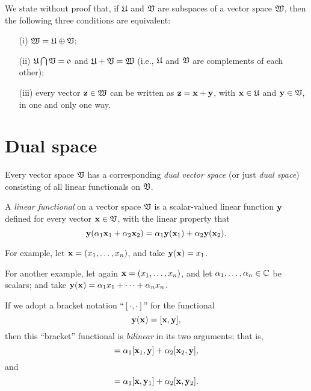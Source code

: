 We state without proof that,
if
${\frak U}$
and
${\frak V}$
are subspaces of a vector space
${\frak W}$,
then the following three conditions are equivalent:
\begin{itemize}
\item[(i)]
${\frak W}={\frak U}\oplus{\frak V}$;
\item[(ii)]
${\frak U}\bigcap{\frak V}={\frak 0}$
and
${\frak U}+{\frak V}={\frak W}$
(i.e., ${\frak U}$
and
${\frak V}$
are complements of each other);
\item[(iii)]
every vector ${\bf z}\in {\frak W}$ can be written as
${\bf z}={\bf x}+{\bf y}$, with
${\bf x}\in {\frak U}$  and
${\bf y}\in {\frak V}$, in one and only one way.
\end{itemize}


\section{Dual space}
\label{2011-m-dvs}

Every vector space ${\frak V}$
has a corresponding {\em dual vector space}
(or just {\em dual space})
consisting of all linear functionals on ${\frak V}$.

A {\em linear functional}
on a vector space ${\frak V}$ is a scalar-valued linear function ${\bf y}$
defined for every vector   ${\bf x} \in {\frak V}$, with the linear property that
\begin{equation}
{\bf y} (\alpha_1 {\bf x}_1 +\alpha_2 {\bf x}_2)
=
\alpha_1 {\bf y} ({\bf x}_1) +\alpha_2 {\bf y} ({\bf x}_2) .
\end{equation}

{\color{blue}
\bexample
For example,
let ${\bf x} = (x_1,\ldots , x_n)$, and
take
${\bf y} ({\bf x}) =x_1$.

For another example,
let again ${\bf x} = (x_1,\ldots , x_n)$, and
let $\alpha_1,\ldots , \alpha_n \in {\Bbb C}$ be scalars; and
take
${\bf y} ({\bf x}) =\alpha_1 x_1 + \cdots +\alpha_n x_n$.
\eexample
}


If we adopt a bracket notation ``$[\cdot , \cdot ]$''
for the functional
\begin{equation}
{\bf y} ({\bf x})
=
[{\bf x},{\bf y}],
\end{equation}
then this ``bracket'' functional is
{\em bilinear} in its two arguments; that is,
\begin{equation}
[ \alpha_1 {\bf x}_1 +\alpha_2 {\bf x}_2, {\bf y}]
=
\alpha_1 [{\bf x}_1 ,{\bf y}]  +\alpha_2  [{\bf x}_2,{\bf y}],
\end{equation}
and
\begin{equation}
[
{\bf x}, \alpha_1 {\bf y}_1 +\alpha_2 {\bf y}_2
]
=
\alpha_1
[{\bf x},{\bf y}_1 ]
+
\alpha_2
[{\bf x},{\bf y}_2].
\end{equation}


